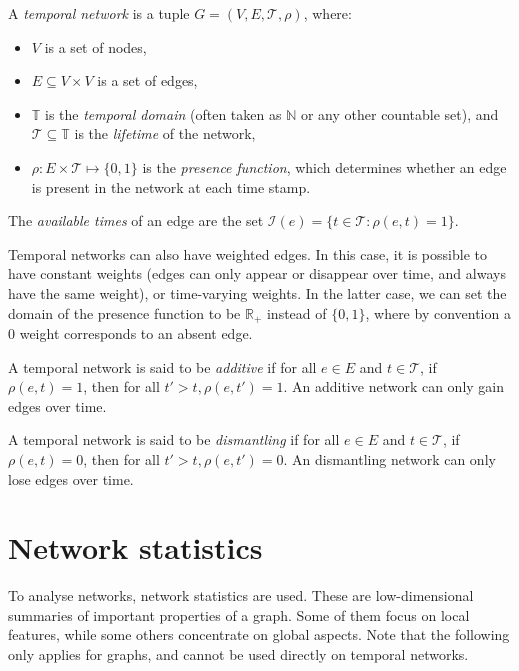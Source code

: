 \documentclass[a4paper,11pt,openany,extrafontsizes]{memoir}
\begin{document}
\begin{defn}\label{defn:temp-net}
  A \emph{temporal network} is a tuple
  $G = (V, E, \mathcal{T}, \rho)$, where:
  \begin{itemize}
  \item $V$ is a set of nodes,
  \item $E\subseteq V\times V$ is a set of edges,
  \item $\mathbb{T}$ is the \emph{temporal domain} (often taken as
    $\mathbb{N}$ or any other countable set), and
    $\mathcal{T}\subseteq\mathbb{T}$ is the \emph{lifetime} of the
    network,
  \item $\rho: E\times\mathcal{T}\mapsto\{0,1\}$ is the \emph{presence
      function}, which determines whether an edge is present in the
    network at each time stamp.
  \end{itemize}
  The \emph{available times} of an edge are the set
  $\mathcal{I}(e) = \{t\in\mathcal{T}: \rho(e,t)=1\}$.
\end{defn}

Temporal networks can also have weighted edges. In this case, it is
possible to have constant weights (edges can only appear or disappear
over time, and always have the same weight), or time-varying
weights. In the latter case, we can set the domain of the presence
function to be $\mathbb{R}_+$ instead of $\{0,1\}$, where by
convention a 0 weight corresponds to an absent edge.

\begin{defn}\label{defn:additive}
  A temporal network is said to be \emph{additive} if for all $e\in E$
  and $t\in\mathcal{T}$, if $\rho(e,t)=1$, then for all
  $t'>t, \rho(e, t') = 1$. An additive network can only gain edges
  over time.

  A temporal network is said to be \emph{dismantling} if for all
  $e\in E$ and $t\in\mathcal{T}$, if $\rho(e,t)=0$, then for all
  $t'>t, \rho(e, t') = 0$. An dismantling network can only lose edges
  over time.
\end{defn}

\section{Network statistics}%
\label{sec:network-statistics}

To analyse networks, network statistics are used. These are
low-dimensional summaries of important properties of a graph. Some of
them focus on local features, while some others concentrate on global
aspects. Note that the following only applies for graphs, and cannot
be used directly on temporal networks.
\end{document}

